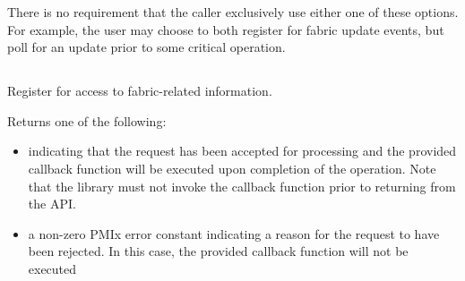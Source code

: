 There is no requirement that the caller exclusively use either one of these options. For example, the user may choose to both register for fabric update events, but poll for an update prior to some critical operation.

\subsection{}

\summary

Register for access to fabric-related information.

\format


\begin{arglist}
\end{arglist}

Returns one of the following:

\begin{itemize}
\item {} indicating that the request has been accepted for processing and the provided callback function will be executed upon completion of the operation. Note that the library must not invoke the callback function prior to returning from the \ac{API}.
\item a non-zero \ac{PMIx} error constant indicating a reason for the request to have been rejected. In this case, the provided callback function will not be executed
\end{itemize}


